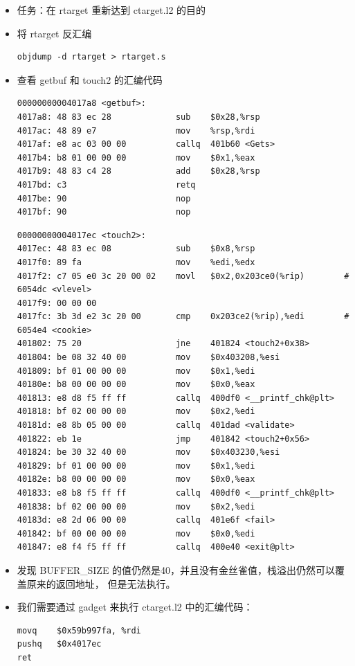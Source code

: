 \documentclass[12pt, a4paper, oneside]{ctexart}
\begin{document}
\begin{itemize}
\begin{figure}[htbp]
\end{figure}
    \item 任务：在 rtarget 重新达到 ctarget.l2 的目的
    \item 将 rtarget 反汇编
\begin{lstlisting}
objdump -d rtarget > rtarget.s
\end{lstlisting}
    \item 查看 getbuf 和 touch2 的汇编代码
\begin{lstlisting}
00000000004017a8 <getbuf>:
4017a8:	48 83 ec 28          	sub    $0x28,%rsp
4017ac:	48 89 e7             	mov    %rsp,%rdi
4017af:	e8 ac 03 00 00       	callq  401b60 <Gets>
4017b4:	b8 01 00 00 00       	mov    $0x1,%eax
4017b9:	48 83 c4 28          	add    $0x28,%rsp
4017bd:	c3                   	retq   
4017be:	90                   	nop
4017bf:	90                   	nop
\end{lstlisting}
\begin{lstlisting}
00000000004017ec <touch2>:
4017ec:	48 83 ec 08          	sub    $0x8,%rsp
4017f0:	89 fa                	mov    %edi,%edx
4017f2:	c7 05 e0 3c 20 00 02 	movl   $0x2,0x203ce0(%rip)        # 6054dc <vlevel>
4017f9:	00 00 00 
4017fc:	3b 3d e2 3c 20 00    	cmp    0x203ce2(%rip),%edi        # 6054e4 <cookie>
401802:	75 20                	jne    401824 <touch2+0x38>
401804:	be 08 32 40 00       	mov    $0x403208,%esi
401809:	bf 01 00 00 00       	mov    $0x1,%edi
40180e:	b8 00 00 00 00       	mov    $0x0,%eax
401813:	e8 d8 f5 ff ff       	callq  400df0 <__printf_chk@plt>
401818:	bf 02 00 00 00       	mov    $0x2,%edi
40181d:	e8 8b 05 00 00       	callq  401dad <validate>
401822:	eb 1e                	jmp    401842 <touch2+0x56>
401824:	be 30 32 40 00       	mov    $0x403230,%esi
401829:	bf 01 00 00 00       	mov    $0x1,%edi
40182e:	b8 00 00 00 00       	mov    $0x0,%eax
401833:	e8 b8 f5 ff ff       	callq  400df0 <__printf_chk@plt>
401838:	bf 02 00 00 00       	mov    $0x2,%edi
40183d:	e8 2d 06 00 00       	callq  401e6f <fail>
401842:	bf 00 00 00 00       	mov    $0x0,%edi
401847:	e8 f4 f5 ff ff       	callq  400e40 <exit@plt>  
\end{lstlisting}
    \item 发现 BUFFER\_SIZE 的值仍然是40，并且没有金丝雀值，栈溢出仍然可以覆盖原来的返回地址，
    但是无法执行。
    \item 我们需要通过 gadget 来执行 ctarget.l2 中的汇编代码：
\begin{lstlisting}
movq    $0x59b997fa, %rdi
pushq   $0x4017ec
ret    
\end{lstlisting}

\end{itemize}
\end{document}
